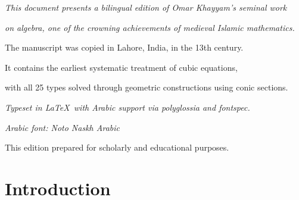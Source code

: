 \documentclass[11pt,a4paper]{book}
\begin{document}
\thispagestyle{empty}
\vspace*{10cm}
\begin{center}
{\small\textit{This document presents a bilingual edition of Omar Khayyam's seminal work}}

{\small\textit{on algebra, one of the crowning achievements of medieval Islamic mathematics.}}

\vspace{0.5cm}
{\small The manuscript was copied in Lahore, India, in the 13th century.}

{\small It contains the earliest systematic treatment of cubic equations,}

{\small with all 25 types solved through geometric constructions using conic sections.}

\vspace{0.5cm}
{\small\textit{Typeset in \LaTeX\ with Arabic support via polyglossia and fontspec.}}

{\small\textit{Arabic font: Noto Naskh Arabic}}

\vspace{0.5cm}
{\footnotesize This edition prepared for scholarly and educational purposes.}
\end{center}
\clearpage

\tableofcontents
\clearpage

\section{Introduction}
\label{sec:intro}
\end{document}
